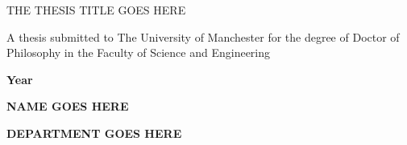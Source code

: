 \documentclass[../main.tex]{subfiles}
\begin{document}
	
\begin{titlepage}
	\begin{center}
		
		\Huge{\textsc{THE THESIS TITLE GOES HERE}}
		
		\vspace{3cm}
		
		\large{A thesis submitted to The University of Manchester for the degree of Doctor of Philosophy in the Faculty of Science and Engineering}
		
		\vspace{3cm}
		
		\textbf{\Large{Year}}
		
		\vspace{3cm}
		
		\textbf{\Large{NAME GOES HERE}}
		
		\vspace{1cm}
		
		\textbf{\Large{DEPARTMENT GOES HERE}}	
		
	\end{center}
\end{titlepage}
\end{document}
